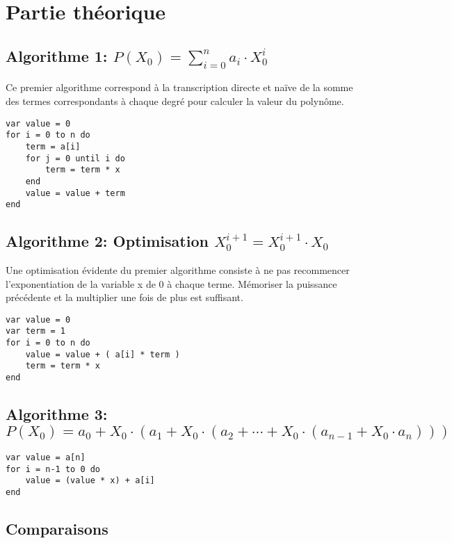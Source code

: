 \documentclass[11pt,a4paper]{article}
\author{Bastien Clément \and Christophe Peretti}
\title{\doctitle }
\begin{document}
\maketitle

\section{Partie théorique}

\subsection{Algorithme 1: $ P(X_{0}) = \sum\limits_{i=0}^{n} a_{i} \cdot X_{0}^{i} $}

Ce premier algorithme correspond à la transcription directe et naïve de la somme des termes correspondants à chaque degré pour calculer la valeur du polynôme.

\begin{lstlisting}
var value = 0
for i = 0 to n do
	term = a[i]
	for j = 0 until i do
		term = term * x
	end
	value = value + term
end
\end{lstlisting}

\subsection{Algorithme 2: Optimisation $ X_{0}^{i+1} = X_{0}^{i+1} \cdot X_{0} $}

Une optimisation évidente du premier algorithme consiste à ne pas recommencer l'exponentiation de la variable x de 0 à chaque terme. Mémoriser la puissance précédente et la multiplier une fois de plus est suffisant.

\begin{lstlisting}
var value = 0
var term = 1
for i = 0 to n do
	value = value + ( a[i] * term )
	term = term * x
end
\end{lstlisting}

\subsection{Algorithme 3: $ P(X_{0}) = a_{0} + X_{0} \cdot (a_{1} + X_{0} \cdot (a_{2} + \cdots + X_{0} \cdot (a_{n-1} + X_{0} \cdot a_{n}))) $}

\begin{lstlisting}
var value = a[n]
for i = n-1 to 0 do
	value = (value * x) + a[i]
end
\end{lstlisting}

\subsection{Comparaisons}
\end{document}
